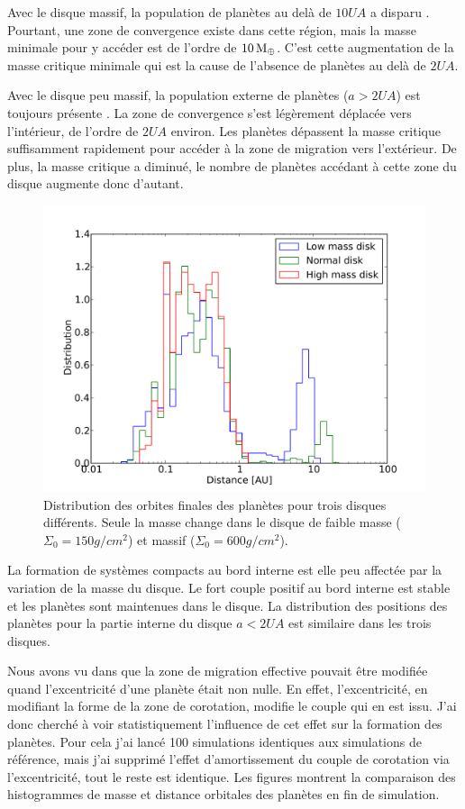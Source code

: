 Avec le disque massif, la population de planètes au delà de $10\unit{UA}$ a disparu . Pourtant, une zone de convergence existe dans cette région, mais la masse minimale pour y accéder est de l'ordre de $10\mathrm{\thinspace M_\oplus}$. C'est cette augmentation de la masse critique minimale qui est la cause de l'absence de planètes au delà de $2\unit{UA}$.

Avec le disque peu massif, la population externe de planètes ($a>2\unit{UA}$) est toujours présente . La zone de convergence s'est légèrement déplacée vers l'intérieur, de l'ordre de $2\unit{UA}$ environ. Les planètes dépassent la masse critique suffisamment rapidement pour accéder à la zone de migration vers l'extérieur. De plus, la masse critique a diminué, le nombre de planètes accédant à cette zone du disque augmente donc d'autant.

\begin{figure}[htbp]
\centering
\includegraphics[width=0.8\linewidth]{figure/HSE/hist_a_disk.pdf}
\caption{Distribution des orbites finales des planètes pour trois disques différents. Seule la masse change dans le disque de faible masse ($\Sigma_0=150\unit{g/cm^2}$) et massif ($\Sigma_0=600\unit{g/cm^2}$).}\label{fig:HSE_hist_a_disk}
\end{figure}

La formation de systèmes compacts au bord interne est elle peu affectée par la variation de la masse du disque. Le fort couple positif au bord interne est stable et les planètes sont maintenues dans le disque. La distribution des positions des planètes pour la partie interne du disque $a<2\unit{UA}$ est similaire dans les trois disques. 

\bigskip

Nous avons vu dans  que la zone de migration effective pouvait être modifiée quand l'excentricité d'une planète était non nulle. En effet, l'excentricité, en modifiant la forme de la zone de corotation, modifie le couple qui en est issu. J'ai donc cherché à voir statistiquement l'influence de cet effet sur la formation des planètes. Pour cela j'ai lancé 100 simulations identiques aux simulations de référence, mais j'ai supprimé l'effet d'amortissement du couple de corotation via l'excentricité, tout le reste est identique. Les figures  montrent la comparaison des histogrammes de masse et distance orbitales des planètes en fin de simulation.

